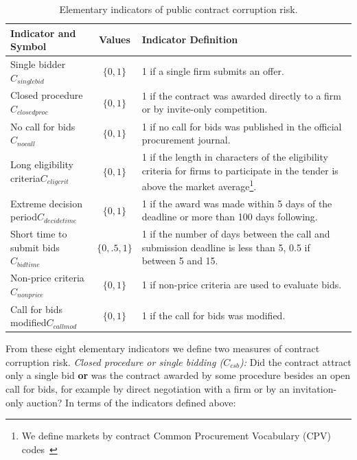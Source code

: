 \begin{table}
\begin{tabular}{p{}cp{}}
\toprule
Indicator and Symbol & Values& Indicator Definition\\
\midrule
Single bidder\newline$C_{singlebid}$ & $\{0,1\}$ & 1 if a single firm submits an offer.\\[.2cm]
Closed procedure\newline$C_{closedproc}$  & $\{0,1\}$ & 1 if the contract was awarded directly to a firm or by invite-only competition. \\[.2cm]
No call for bids\newline$C_{nocall}$  & $\{0,1\}$ & 1 if no call for bids was published in the official procurement journal. \\[.2cm]
Long eligibility criteria\newline$C_{eligcrit}$   & $\{0,1\}$ & 1 if the length in characters of the  eligibility criteria for firms to participate in the tender is above the market average\footnote{We define markets by contract Common Procurement Vocabulary (CPV) codes~\cite{cpvreport}}. \\[.2cm]
Extreme decision period\newline$C_{decidetime}$ & $\{0,1\}$& 1 if the award was made within 5 days of the deadline or more than 100 days following.\\[.2cm]
Short time to submit bids\newline$C_{bidtime}$ & $\{0,.5,1\}$ & 1 if the number of days between the call and submission deadline is less than 5, 0.5 if between 5 and 15.\\[.2cm]
Non-price criteria\newline$C_{nonprice}$ &$\{0,1\}$ & 1 if non-price criteria are used to evaluate bids.\\[.2cm]
Call for bids modified\newline$C_{callmod}$  & $\{0,1\}$& 1 if the call for bids was modified.\\[.2cm]
\bottomrule
\end{tabular}
\caption[Elementary indicators of corruption risk on public contracts]{Elementary indicators of public contract corruption risk.}\label{table:cri}
\end{table}

From these eight elementary indicators we define two measures of contract corruption risk. \textit{Closed procedure or single bidding ($C_{csb}$):} Did the contract attract only a single bid \textbf{or} was the contract awarded by some procedure besides an open call for bids, for example by direct negotiation with a firm or by an invitation-only auction? In terms of the indicators defined above:

